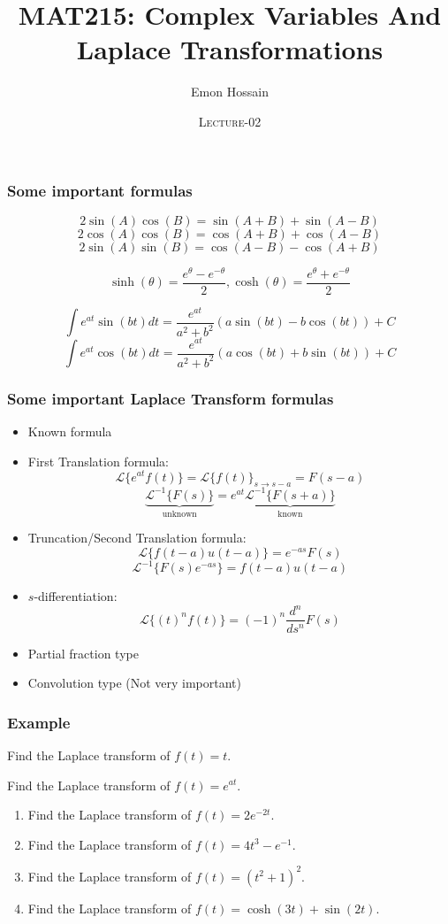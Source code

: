 \documentclass[11pt]{beamer}
\author[] %
{Emon Hossain\inst{1}}
\institute[University of Dhaka] %
{
  \inst{1}%
  Lecturer\\MNS department\\Brac University
}
\date[] %
{\textsc{Lecture-02}}
\title[]{MAT215: Complex Variables And Laplace Transformations}
\theoremstyle{plain}
\begin{document}
\begin{frame}
\titlepage
\end{frame}

\begin{frame}
    \frametitle{Some important formulas}
    $$
    2 \sin(A)\cos(B)=\sin(A+B)+\sin(A-B)
    $$
    $$
    2 \cos(A)\cos(B)=\cos(A+B)+\cos(A-B)
    $$
    $$
    2 \sin(A)\sin(B)=\cos(A-B)-\cos(A+B)
    $$

    $$\sinh (\theta) =\frac{e^\theta- e^{-\theta}}{2}, \cosh (\theta) =\frac{e^\theta+ e^{-\theta}}{2}$$

    $$
    \int e^{at}\sin(bt)dt=\frac{e^{at}}{a^2+b^2}(a\sin(bt)-b\cos(bt))+C
    $$
    $$\int e^{at}\cos(bt)dt=\frac{e^{at}}{a^2+b^2}(a\cos(bt)+b\sin(bt))+C$$
\end{frame}

\begin{frame}
    \frametitle{Some important Laplace Transform formulas}
     \begin{itemize}[label=$\bullet$]
    \item Known formula 
    \item First Translation formula:
    $$\boxed{\mathcal L\{e^{at}f(t)\}=\mathcal L\{f(t)\}_{s\rightarrow s-a}=F(s-a)}$$
    $$
    \boxed{\underbrace{\mathcal L^{-1}\{F(s)\}}_{\text{unknown}}=e^{at}\underbrace{\mathcal L^{-1}\{F(s+a)\}}_{\text{known}}}
    $$
    \item Truncation/Second Translation formula:
    $$\boxed{\mathcal{L}\{f(t-a)u(t-a)\}=e^{-as}F(s)}$$
    $$\boxed{\mathcal{L}^{-1}\{F(s)e^{-as}\}=f(t-a)u(t-a)}$$
    \item $s$-differentiation:
    $$\boxed{\mathcal{L}\{(t)^nf(t)\}=(-1)^n\frac{d^n}{ds^n}F(s)}$$  
    \item Partial fraction type
    \item Convolution type (Not very important)
\end{itemize}
\end{frame}

\begin{frame}
    \frametitle{Example}
    \begin{example}
        Find the Laplace transform of $f(t)=t$.
    \end{example}
    \begin{example}
        Find the Laplace transform of $f(t)=e^{at}$.
    \end{example}
\begin{example}
        \begin{enumerate}[label=\alph*.]
            \item Find the Laplace transform of $f(t)= 2e^{-2t}$.
            \item Find the Laplace transform of $f(t)= 4t^3-e^{-1}$.
            \item Find the Laplace transform of $f(t)= (t^2+1)^2$.
            \item Find the Laplace transform of $f(t)= \cosh(3t)+\sin(2t)$.
        \end{enumerate}
    \end{example}
\end{frame}
\end{document}
